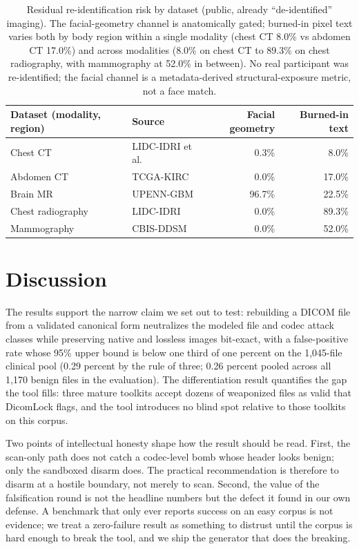 \documentclass[11pt]{article}
\begin{document}
\begin{table}[ht]
\centering
\caption{Residual re-identification risk by dataset (public, already ``de-identified'' imaging). The facial-geometry channel is anatomically gated; burned-in pixel text varies both by body region within a single modality (chest CT 8.0\% vs abdomen CT 17.0\%) and across modalities (8.0\% on chest CT to 89.3\% on chest radiography, with mammography at 52.0\% in between). No real participant was re-identified; the facial channel is a metadata-derived structural-exposure metric, not a face match.}
\label{tab:reid}
\begin{tabular}{@{}llrr@{}}
\toprule
Dataset (modality, region) & Source & Facial geometry & Burned-in text \\
\midrule
Chest CT & LIDC-IDRI et al. & 0.3\% & 8.0\% \\
Abdomen CT & TCGA-KIRC & 0.0\% & 17.0\% \\
Brain MR & UPENN-GBM & 96.7\% & 22.5\% \\
Chest radiography & LIDC-IDRI & 0.0\% & 89.3\% \\
Mammography & CBIS-DDSM & 0.0\% & 52.0\% \\
\bottomrule
\end{tabular}
\end{table}

\section{Discussion}

The results support the narrow claim we set out to test: rebuilding a DICOM file from a validated canonical form neutralizes the modeled file and codec attack classes while preserving native and lossless images bit-exact, with a false-positive rate whose 95\% upper bound is below one third of one percent on the 1,045-file clinical pool (0.29 percent by the rule of three; 0.26 percent pooled across all 1,170 benign files in the evaluation). The differentiation result quantifies the gap the tool fills: three mature toolkits accept dozens of weaponized files as valid that DicomLock flags, and the tool introduces no blind spot relative to those toolkits on this corpus.

Two points of intellectual honesty shape how the result should be read. First, the scan-only path does not catch a codec-level bomb whose header looks benign; only the sandboxed disarm does. The practical recommendation is therefore to disarm at a hostile boundary, not merely to scan. Second, the value of the falsification round is not the headline numbers but the defect it found in our own defense. A benchmark that only ever reports success on an easy corpus is not evidence; we treat a zero-failure result as something to distrust until the corpus is hard enough to break the tool, and we ship the generator that does the breaking.
\end{document}
